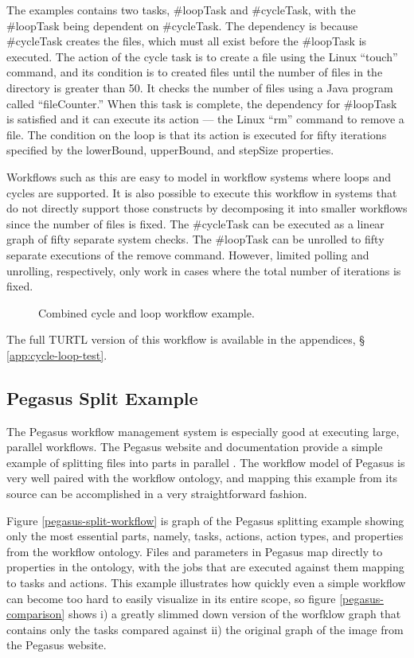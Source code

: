 The examples contains two tasks, \#loopTask and \#cycleTask, with the \#loopTask
being dependent on \#cycleTask. The dependency is because \#cycleTask
creates the files, which must all exist before the \#loopTask is executed. The
action of the cycle task is to create a file using the Linux ``touch'' command,
and its condition is to created files until the number of files in the directory
is greater than 50. It checks the number of files using a Java program called
``fileCounter.'' When this task is complete, the dependency for \#loopTask is
satisfied and it can execute its action --- the Linux ``rm'' command to remove a
file. The condition on the loop is that its action is executed for fifty
iterations specified by the lowerBound, upperBound, and stepSize properties.

Workflows such as this are easy to model in workflow systems where loops and
cycles are supported. It is also possible to execute this workflow in systems
that do not directly support those constructs by decomposing it into smaller
workflows since the number of files is fixed. The \#cycleTask can be
executed as a linear graph of fifty separate system checks. The \#loopTask can
be unrolled to fifty separate executions of the remove command. However, limited
polling and unrolling, respectively, only work in cases where the total number
of iterations is fixed.

\begin{figure}[htbp]
\centering
{}
\caption{Combined cycle and loop workflow example.}
\label{cycle-loop-test}
\end{figure}

The full TURTL version of this workflow is available in the appendices, \S
\ref{app:cycle-loop-test}.

\subsection{Pegasus Split Example}

The Pegasus workflow management system is especially good at executing large,
parallel workflows. The Pegasus website and documentation provide a simple
example of splitting files into parts in parallel
\cite{noauthor_workflow_nodate}. The workflow model of Pegasus is very well
paired with the workflow ontology, and mapping this example from its source can
be accomplished in a very straightforward fashion.

Figure \ref{pegasus-split-workflow} is graph of the Pegasus splitting example
showing only the most essential parts, namely, tasks, actions, action types, and
properties from the workflow ontology. Files and parameters in Pegasus map
directly to properties in the ontology, with the jobs that are executed against
them mapping to tasks and actions. This example illustrates how quickly even a
simple workflow can become too hard to easily visualize in its entire scope, so
figure \ref{pegasus-comparison} shows i) a greatly slimmed down version of the
worfklow graph that contains only the tasks compared against ii) the original
graph of the image from the Pegasus website.

